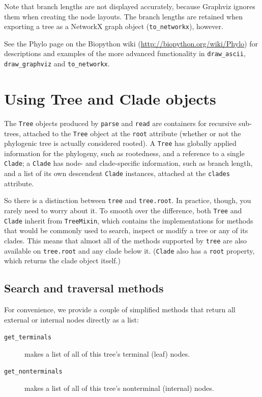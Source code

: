 \documentclass{report}
\begin{document}
Note that branch lengths are not displayed accurately, because Graphviz ignores them when
creating the node layouts. The branch lengths are retained when exporting a tree as a NetworkX
graph object (\verb|to_networkx|), however.

See the Phylo page on the Biopython wiki (\url{http://biopython.org/wiki/Phylo}) for
descriptions and examples of the more advanced functionality in \verb|draw_ascii|,
\verb|draw_graphviz| and \verb|to_networkx|.


\section{Using Tree and Clade objects}

The \verb|Tree| objects produced by \verb|parse| and \verb|read| are containers for recursive
sub-trees, attached to the \verb|Tree| object at the \verb|root| attribute (whether or not the
phylogenic tree is actually considered rooted). A \verb|Tree| has globally applied information
for the phylogeny, such as rootedness, and a reference to a single \verb|Clade|; a
\verb|Clade| has node- and clade-specific information, such as branch length, and a list of
its own descendent \verb|Clade| instances, attached at the \verb|clades| attribute.

So there is a distinction between \verb|tree| and \verb|tree.root|. In practice, though, you
rarely need to worry about it. To smooth over the difference, both \verb|Tree| and
\verb|Clade| inherit from \verb|TreeMixin|, which contains the implementations for methods
that would be commonly used to search, inspect or modify a tree or any of its clades. This
means that almost all of the methods supported by \verb|tree| are also available on
\verb|tree.root| and any clade below it. (\verb|Clade| also has a \verb|root| property, which
returns the clade object itself.)


\subsection{Search and traversal methods}

For convenience, we provide a couple of simplified methods that return all external or internal
nodes directly as a list:

\begin{description}
  \item[\texttt{get\_terminals}] makes a list of all of this tree's terminal (leaf) nodes.
  \item[\texttt{get\_nonterminals}] makes a list of all of this tree's nonterminal (internal)
    nodes.
\end{description}
\end{document}
